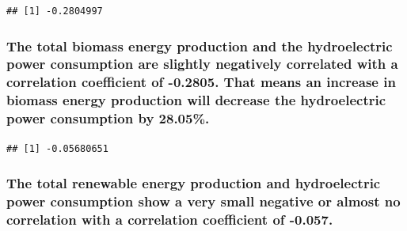 \documentclass[
]{article}
\newenvironment{Shaded}{\begin{snugshade}}{\end{snugshade}}
\newcommand{\FunctionTok}[1]{\textcolor[rgb]{0.00,0.00,0.00}{#1}}
\newcommand{\NormalTok}[1]{#1}
\newcommand{\SpecialCharTok}[1]{\textcolor[rgb]{0.00,0.00,0.00}{#1}}
\begin{document}
\begin{Shaded}
\end{Shaded}

\begin{verbatim}
## [1] -0.2804997
\end{verbatim}

\hypertarget{the-total-biomass-energy-production-and-the-hydroelectric-power-consumption-are-slightly-negatively-correlated-with-a-correlation-coefficient-of--0.2805.-that-means-an-increase-in-biomass-energy-production-will-decrease-the-hydroelectric-power-consumption-by-28.05.}{%
\subsubsection{The total biomass energy production and the hydroelectric
power consumption are slightly negatively correlated with a correlation
coefficient of -0.2805. That means an increase in biomass energy
production will decrease the hydroelectric power consumption by
28.05\%.}\label{the-total-biomass-energy-production-and-the-hydroelectric-power-consumption-are-slightly-negatively-correlated-with-a-correlation-coefficient-of--0.2805.-that-means-an-increase-in-biomass-energy-production-will-decrease-the-hydroelectric-power-consumption-by-28.05.}}

\begin{Shaded}
\end{Shaded}

\begin{verbatim}
## [1] -0.05680651
\end{verbatim}

\hypertarget{the-total-renewable-energy-production-and-hydroelectric-power-consumption-show-a-very-small-negative-or-almost-no-correlation-with-a-correlation-coefficient-of--0.057.}{%
\subsubsection{The total renewable energy production and hydroelectric
power consumption show a very small negative or almost no correlation
with a correlation coefficient of
-0.057.}\label{the-total-renewable-energy-production-and-hydroelectric-power-consumption-show-a-very-small-negative-or-almost-no-correlation-with-a-correlation-coefficient-of--0.057.}}
\end{document}
